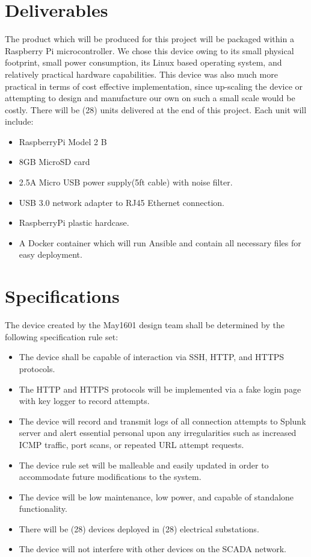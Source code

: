 \section{Deliverables}

The product which will be produced for this project will be packaged within a Raspberry Pi microcontroller. We chose this device owing to its small physical footprint, small power consumption, its Linux based operating system, and relatively practical hardware capabilities. This device was also much more practical in terms of cost effective implementation, since up-scaling the device or attempting to design and manufacture our own on such a small scale would be costly. There will be (28) units delivered at the end of this project. Each unit will include:

\begin{itemize} 
\item RaspberryPi Model 2 B
\item 8GB MicroSD card
\item 2.5A Micro USB power supply(5ft cable) with noise filter.
\item USB 3.0 network adapter to RJ45 Ethernet connection.
\item RaspberryPi plastic hardcase.
\item A Docker container which will run Ansible and contain all necessary files for easy deployment.
\end{itemize}

\section{Specifications}

The device created by the May1601 design team shall be determined by the following specification rule set:

\begin{itemize} 
\item The device shall be capable of interaction via SSH, HTTP, and HTTPS protocols.
\item The HTTP and HTTPS protocols will be implemented via a fake login page with key logger to record attempts.
\item The device will record and transmit logs of all connection attempts to Splunk server and alert essential personal upon any irregularities such as increased ICMP traffic, port scans, or repeated URL attempt requests. 
\item The device rule set will be malleable and easily updated in order to accommodate future modifications to the system.
\item The device will be low maintenance, low power, and capable of standalone functionality. 
\item There will be (28) devices deployed in (28) electrical substations. 
\item The device will not interfere with other devices on the SCADA network.
\end{itemize}
